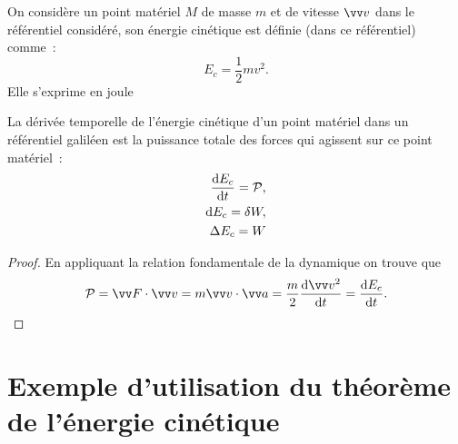 \begin{defdef}
  On considère un point matériel $M$ de masse $m$ et de vitesse $\vvv$ dans le référentiel considéré, son énergie cinétique est définie (dans ce référentiel) comme~:
  \begin{equation}
    E_c = \frac{1}{2} m v^2.
  \end{equation}
  Elle s'exprime en joule
\end{defdef}
\begin{theo}
  La dérivée temporelle de l'énergie cinétique d'un point matériel dans un référentiel galiléen est la puissance totale des forces qui agissent sur ce point matériel~:
  \begin{align}
    \dfrac{\mathrm{d} E_c}{\mathrm{d} t} = \mathcal{P}, \\
    \mathop{}\mathopen{}\mathrm{d} E_c = \delta W, \\
    \Delta E_c = W
  \end{align}
\end{theo}
\begin{proof}
  En appliquant la relation fondamentale de la dynamique on trouve que
  \begin{equation}
    \P = \vF \cdot \vvv = m \vvv \cdot \va = \frac{m}{2} \derived{\vvv^2}{t} = \derived{E_c}{t}.
  \end{equation}
\end{proof}

\section{Exemple d'utilisation du théorème de l'énergie cinétique}
\label{chap4-sec:exempletheoremeenergiecinetique}

